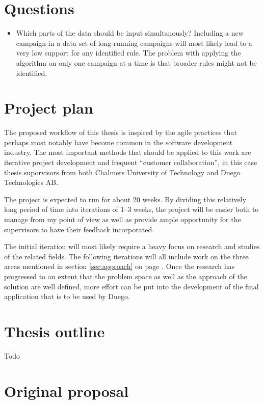 \documentclass[a4paper]{article}
\begin{document}
\section{Questions}
\begin{itemize}
	\item Which parts of the data should be input simultanously? Including a new campaign in a data set of long-running 
		campaigns will most likely lead to a very low support for any identified rule. The problem with applying the algorithm
		on only one campaign at a time is that broader rules might not be identified.
\end{itemize}

\section{Project plan}
The proposed workflow of this thesis is inspired by the agile practices that perhaps most notably have become 
common in the software development industry. The most important methods that should be applied to this work are
iterative project development and frequent ``customer collaboration'', in this case thesis suporvisors from both
Chalmers University of Technology and Duego Technologies AB.

The project is expected to run for about 20 weeks. By dividing this relatively long period of time into iterations
of 1--3 weeks, the project will be easier both to manage from my point of view as well as provide ample opportunity
for the supervisors to have their feedback incorporated.

The initial iteration will most likely require a heavy focus on research and studies of the related fields. The following
iterations will all include work on the three areas mentioned in section \ref{sec:approach} on page \pageref{sec:approach}.
Once the research has progressed to an extent that the problem space as well as the approach of the solution are well defined, 
more effort can be put into the development of the final application that is to be used by Duego.

\section{Thesis outline}
Todo

\section{Original proposal}
\end{document}
